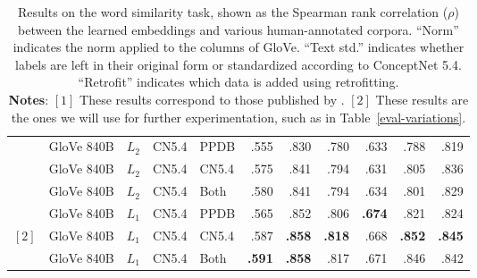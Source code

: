 \documentclass[letterpaper]{article}
\begin{document}
\begin{table*}[t]
\begin{tabular}{lllllrrrrrr}
     &GloVe 840B   & $L_2$ & CN5.4     & PPDB     &     .555 &     .830 &      .780 &      .633 &     .788 &     .819 \\
     &GloVe 840B   & $L_2$ & CN5.4     & CN5.4    &     .575 &     .841 &      .794 &      .631 &     .805 &     .836 \\
     &GloVe 840B   & $L_2$ & CN5.4     & Both     &     .580 &     .841 &      .794 &      .634 &     .801 &     .829 \\
     &GloVe 840B   & $L_1$ & CN5.4     & PPDB     &     .565 &     .852 &      .806 & {\bf .674}&     .821 &     .824 \\
$[2]$&GloVe 840B   & $L_1$ & CN5.4     & CN5.4    &     .587 &{\bf .858}& {\bf .818}&      .668 &{\bf .852}&{\bf .845}\\
     &GloVe 840B   & $L_1$ & CN5.4     & Both     &{\bf .591}&{\bf .858}&      .817 &      .671 &     .846 &     .842 \\
\bottomrule
\end{tabular}

\caption{
    Results on the word similarity task, shown as the Spearman rank correlation
    ($\rho$) between the learned embeddings and various human-annotated corpora.
    ``Norm'' indicates the norm applied to the columns of GloVe.
    ``Text std.'' indicates whether labels are left in their original form or
    standardized according to ConceptNet 5.4. ``Retrofit'' indicates which data
    is added using retrofitting.\\
    {\bf Notes}: $[1]$ These results correspond to those published by .
    $[2]$ These results are the ones we will use for further experimentation, such as in Table~\ref{eval-variations}.
}
\label{eval-retro-standardize}
\end{table*}
\end{document}
